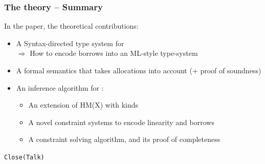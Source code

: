 \documentclass[aspectratio=169,dvipsnames,svgnames,10pt]{beamer}
\begin{document}
\begin{frame}
  \frametitle{The theory -- Summary}
  In the paper, the theoretical contributions:

  \begin{itemize}
  \item A Syntax-directed type system for \lang\\
    $\Rightarrow$ How to encode borrows into an ML-style type-system
  \item A formal semantics that takes allocations into account (+ proof of soundness)
  \item An inference algorithm for \lang:
    \begin{itemize}
    \item An extension of HM(X) with kinds
    \item A novel constraint systems to encode linearity and borrows
    \item A constraint solving algorithm, and its proof of completeness
    \end{itemize}
  \end{itemize}
\end{frame}

\begin{frame}[standout]

  \centering\Huge\texttt{Close(Talk)}
  
\end{frame}


\end{document}
